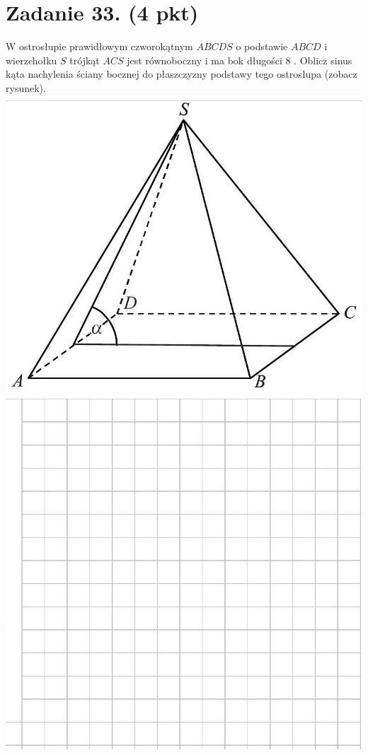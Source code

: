 \documentclass[10pt]{article}
\begin{document}
\section*{Zadanie 33. (4 pkt)}
W ostrosłupie prawidłowym czworokątnym \(A B C D S\) o podstawie \(A B C D\) i wierzchołku \(S\) trójkąt \(A C S\) jest równoboczny i ma bok długości 8 . Oblicz sinus kąta nachylenia ściany bocznej do płaszczyzny podstawy tego ostrosłupa (zobacz rysunek).\\
\includegraphics[max width=\textwidth, center]{2024_11_21_6a8be49478f78d0689cfg-16}\\
\includegraphics[max width=\textwidth, center]{2024_11_21_6a8be49478f78d0689cfg-16(1)}\\
\end{document}
